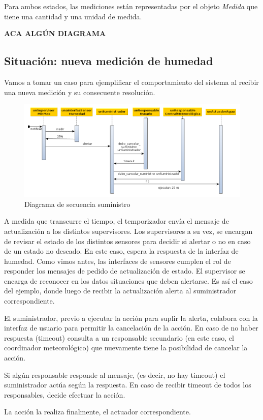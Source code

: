 Para ambos estados, las mediciones están representadas por el objeto \textit{Medida} que  tiene una cantidad y una unidad de medida.

\textbf{ACA ALGÚN DIAGRAMA}



\subsection{Situación: nueva medición de humedad}
Vamos a tomar un caso para ejemplificar el comportamiento del sistema al recibir una nueva medición y su consecuente resolución.

\begin{figure}[h!]
  \centering
  \includegraphics[width=1\textwidth]{./imagenes/secuencia_suministro1.png}
  \caption{Diagrama de secuencia suministro}
  \label{fig:sec_sum1}
\end{figure}

A medida que transcurre el tiempo, el temporizador envía el mensaje de actualización a los distintos supervisores. 
Los supervisores a su vez, se encargan de revisar el estado de los distintos sensores para decidir si alertar o no en caso de un estado no deseado.
En este caso, espera la respuesta de la interfaz de humedad. Como vimos antes, las interfaces de sensores cumplen el rol de responder los mensajes de pedido de actualización de estado. 
El supervisor se encarga de reconocer en los datos situaciones que deben alertarse. Es así el caso del ejemplo, donde luego de recibir la actualización alerta al suministrador correspondiente.

El suministrador, previo a ejecutar la acción para suplir la alerta, colabora con la interfaz de usuario para permitir la cancelación de la acción. En caso de no haber respuesta (timeout) consulta a un responsable secundario (en este caso, el coordinador meteorológico) que nuevamente tiene la posibilidad de cancelar la acción.

Si algún responsable responde al mensaje, (es decir, no hay timeout) el suministrador actúa según la respuesta. En caso de recibir timeout de todos los responsables, decide efectuar la acción.

La acción la realiza finalmente, el actuador correspondiente.
